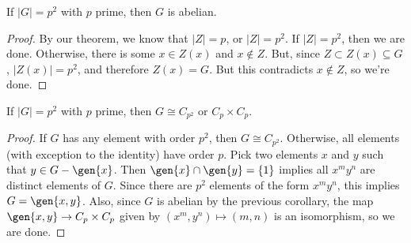 \begin{theorem}
\corlabel

If $\vert G\vert = p^2$ with $p$ prime, then $G$ is abelian.
\end{theorem}

\begin{proof}
By our theorem, we know that $\vert Z\vert = p$, or $\vert Z\vert = p^2$. If $\vert Z\vert = p^2$, then we are done. Otherwise, there is some $x\in Z(x)$ and $x\not\in Z$. But, since $Z\subset Z(x)\subseteq G$, $\vert Z(x)\vert = p^2$, and therefore $Z(x) = G$. But this contradicts $x\not\in Z$, so we're done.
\end{proof}

\begin{theorem}
\corlabel

If $\vert G\vert = p^2$ with $p$ prime, then $G\cong C_{p^2}$ or $C_p\times C_p$. 
\end{theorem}

\begin{proof}
If $G$ has any element with order $p^2$, then $G\cong C_{p^2}$. Otherwise, all elements (with exception to the identity) have order $p$. Pick two elements $x$ and $y$ such that $y\in G-\gen{x}$. Then $\gen{x}\cap \gen{y} = \{1\}$ implies all $x^my^n$ are distinct elements of $G$. Since there are $p^2$ elements of the form $x^my^n$, this implies $G = \gen{x,y}$. Also, since $G$ is abelian by the previous corollary, the map $\gen{x,y}\rightarrow C_p\times C_p$ given by $(x^m,y^n)\mapsto (m,n)$ is an isomorphism, so we are done. 
\end{proof}
